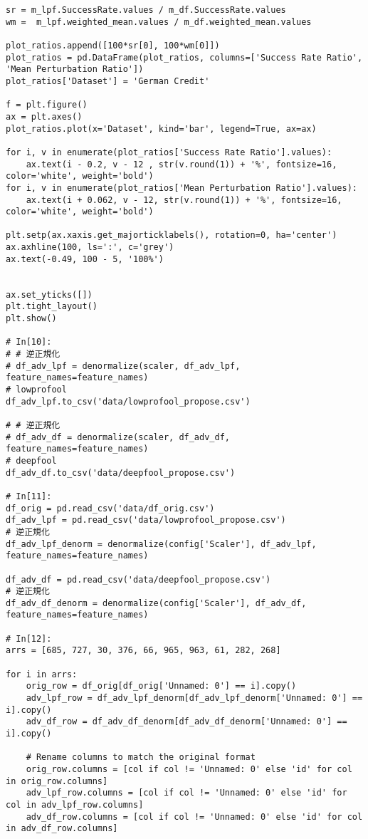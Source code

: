 \begin{lstlisting}[style=jupyter, caption=敵対的サンプルを生成する流れの処理]
sr = m_lpf.SuccessRate.values / m_df.SuccessRate.values 
wm =  m_lpf.weighted_mean.values / m_df.weighted_mean.values 

plot_ratios.append([100*sr[0], 100*wm[0]])
plot_ratios = pd.DataFrame(plot_ratios, columns=['Success Rate Ratio', 'Mean Perturbation Ratio'])
plot_ratios['Dataset'] = 'German Credit'

f = plt.figure()
ax = plt.axes()
plot_ratios.plot(x='Dataset', kind='bar', legend=True, ax=ax)

for i, v in enumerate(plot_ratios['Success Rate Ratio'].values):
    ax.text(i - 0.2, v - 12 , str(v.round(1)) + '%', fontsize=16, color='white', weight='bold')
for i, v in enumerate(plot_ratios['Mean Perturbation Ratio'].values):
    ax.text(i + 0.062, v - 12, str(v.round(1)) + '%', fontsize=16, color='white', weight='bold')

plt.setp(ax.xaxis.get_majorticklabels(), rotation=0, ha='center')
ax.axhline(100, ls=':', c='grey')
ax.text(-0.49, 100 - 5, '100%')


ax.set_yticks([])
plt.tight_layout()
plt.show()

# In[10]:
# # 逆正規化
# df_adv_lpf = denormalize(scaler, df_adv_lpf, feature_names=feature_names)
# lowprofool
df_adv_lpf.to_csv('data/lowprofool_propose.csv')

# # 逆正規化
# df_adv_df = denormalize(scaler, df_adv_df, feature_names=feature_names)
# deepfool
df_adv_df.to_csv('data/deepfool_propose.csv')

# In[11]:
df_orig = pd.read_csv('data/df_orig.csv')
df_adv_lpf = pd.read_csv('data/lowprofool_propose.csv')
# 逆正規化
df_adv_lpf_denorm = denormalize(config['Scaler'], df_adv_lpf, feature_names=feature_names)

df_adv_df = pd.read_csv('data/deepfool_propose.csv')
# 逆正規化
df_adv_df_denorm = denormalize(config['Scaler'], df_adv_df, feature_names=feature_names)

# In[12]:
arrs = [685, 727, 30, 376, 66, 965, 963, 61, 282, 268]

for i in arrs:
    orig_row = df_orig[df_orig['Unnamed: 0'] == i].copy()
    adv_lpf_row = df_adv_lpf_denorm[df_adv_lpf_denorm['Unnamed: 0'] == i].copy()
    adv_df_row = df_adv_df_denorm[df_adv_df_denorm['Unnamed: 0'] == i].copy()
    
    # Rename columns to match the original format
    orig_row.columns = [col if col != 'Unnamed: 0' else 'id' for col in orig_row.columns]
    adv_lpf_row.columns = [col if col != 'Unnamed: 0' else 'id' for col in adv_lpf_row.columns]
    adv_df_row.columns = [col if col != 'Unnamed: 0' else 'id' for col in adv_df_row.columns]
    

\end{lstlisting}

